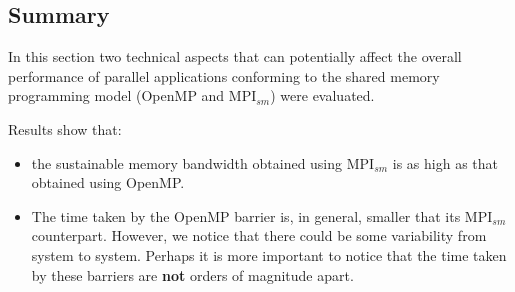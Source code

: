 \medskip



\subsection*{Summary}

In this section two technical aspects that can potentially affect the overall performance of parallel applications conforming to the shared memory programming model (OpenMP and MPI$_{sm}$) were evaluated.

\medskip

Results show that: 

\begin{itemize} 

    \item the sustainable memory bandwidth obtained using MPI$_{sm}$ is as high as that obtained using OpenMP.

    \item The time taken by the OpenMP barrier is, in general, smaller that its MPI$_{sm}$ counterpart. However, we notice that there could be some variability from system to system. Perhaps it is more important to notice that the time taken by these barriers are \textbf{not} orders of magnitude apart.

\end{itemize}


\medskip



